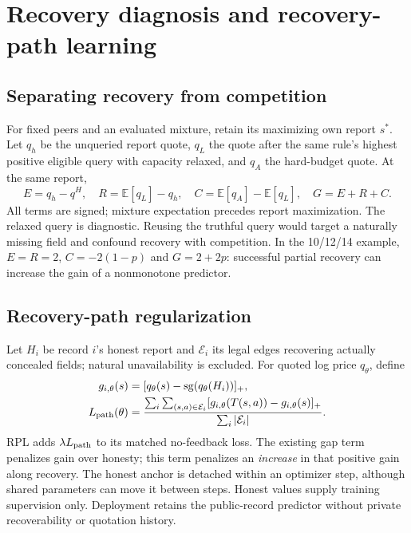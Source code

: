 \documentclass[11pt]{article}
\begin{document}
\section{Recovery diagnosis and recovery-path learning}\label{sec:recovery}
\subsection{Separating recovery from competition}
For fixed peers and an evaluated mixture, retain its maximizing own report
$s^*$. Let $q_h$ be the unqueried report quote, $q_L$ the quote after the
same rule's highest positive eligible query with capacity relaxed, and $q_A$
the hard-budget quote. At the same report,
\[
 E=q_h-q^H,\quad R=\mathbb E[q_L]-q_h,\quad
 C=\mathbb E[q_A]-\mathbb E[q_L],\quad G=E+R+C.
\]
All terms are signed; mixture expectation precedes report maximization.
The relaxed query is diagnostic. Reusing the truthful query would target a
naturally missing field and confound recovery with competition. In the
10/12/14 example, $E=R=2$, $C=-2(1-p)$ and $G=2+2p$: successful partial
recovery can increase the gain of a nonmonotone predictor.

\subsection{Recovery-path regularization}\label{sec:rpl_method}
Let $H_i$ be record $i$'s honest report and $\mathcal E_i$ its legal edges
recovering actually concealed fields; natural unavailability is excluded.
For quoted log price $q_\theta$, define
\begin{align}
 g_{i,\theta}(s)&=[q_\theta(s)-\operatorname{sg}(q_\theta(H_i))]_+,\\
 L_{\rm path}(\theta)&=\frac{\sum_i\sum_{(s,a)\in\mathcal E_i}
 [g_{i,\theta}(T(s,a))-g_{i,\theta}(s)]_+}
 {\sum_i|\mathcal E_i|}.\label{eq:rpl}
\end{align}
RPL adds $\lambda L_{\rm path}$ to its matched no-feedback loss. The existing
gap term penalizes gain over honesty; this term penalizes an \emph{increase}
in that positive gain along recovery. The honest anchor is detached within
an optimizer step, although shared parameters can move it between steps.
Honest values supply training supervision only. Deployment retains the
public-record predictor without private recoverability or quotation history.
\end{document}
